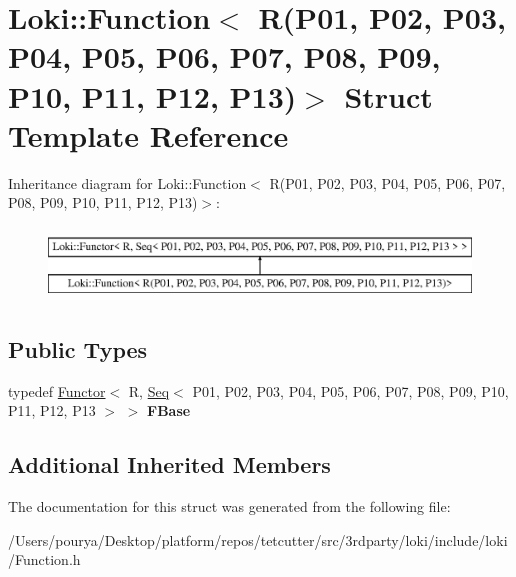 \hypertarget{structLoki_1_1Function_3_01R_07P01_00_01P02_00_01P03_00_01P04_00_01P05_00_01P06_00_01P07_00_01P0c0ed039e3c26eca6bfcbf0d14db9de6b}{}\section{Loki\+:\+:Function$<$ R(P01, P02, P03, P04, P05, P06, P07, P08, P09, P10, P11, P12, P13)$>$ Struct Template Reference}
\label{structLoki_1_1Function_3_01R_07P01_00_01P02_00_01P03_00_01P04_00_01P05_00_01P06_00_01P07_00_01P0c0ed039e3c26eca6bfcbf0d14db9de6b}
Inheritance diagram for Loki\+:\+:Function$<$ R(P01, P02, P03, P04, P05, P06, P07, P08, P09, P10, P11, P12, P13)$>$\+:\begin{figure}[H]
\begin{center}
\leavevmode
\includegraphics[height=1.954625cm]{structLoki_1_1Function_3_01R_07P01_00_01P02_00_01P03_00_01P04_00_01P05_00_01P06_00_01P07_00_01P0c0ed039e3c26eca6bfcbf0d14db9de6b}
\end{center}
\end{figure}
\subsection*{Public Types}
\begin{DoxyCompactItemize}
\item 
\hypertarget{structLoki_1_1Function_3_01R_07P01_00_01P02_00_01P03_00_01P04_00_01P05_00_01P06_00_01P07_00_01P0c0ed039e3c26eca6bfcbf0d14db9de6b_ab20fb6ba3465485d6b9c81a57f0818be}{}typedef \hyperlink{classLoki_1_1Functor}{Functor}$<$ R, \hyperlink{structLoki_1_1Seq}{Seq}$<$ P01, P02, P03, P04, P05, P06, P07, P08, P09, P10, P11, P12, P13 $>$ $>$ {\bfseries F\+Base}\label{structLoki_1_1Function_3_01R_07P01_00_01P02_00_01P03_00_01P04_00_01P05_00_01P06_00_01P07_00_01P0c0ed039e3c26eca6bfcbf0d14db9de6b_ab20fb6ba3465485d6b9c81a57f0818be}

\end{DoxyCompactItemize}
\subsection*{Additional Inherited Members}


The documentation for this struct was generated from the following file\+:\begin{DoxyCompactItemize}
\item 
/\+Users/pourya/\+Desktop/platform/repos/tetcutter/src/3rdparty/loki/include/loki/Function.\+h\end{DoxyCompactItemize}
